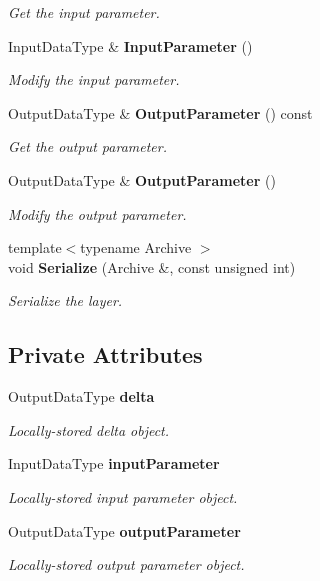 \begin{DoxyCompactItemize}
\begin{DoxyCompactList}\small\item\em Get the input parameter. \end{DoxyCompactList}\item 
Input\+Data\+Type \& {\bf Input\+Parameter} ()
\begin{DoxyCompactList}\small\item\em Modify the input parameter. \end{DoxyCompactList}\item 
Output\+Data\+Type \& {\bf Output\+Parameter} () const 
\begin{DoxyCompactList}\small\item\em Get the output parameter. \end{DoxyCompactList}\item 
Output\+Data\+Type \& {\bf Output\+Parameter} ()
\begin{DoxyCompactList}\small\item\em Modify the output parameter. \end{DoxyCompactList}\item 
{\footnotesize template$<$typename Archive $>$ }\\void {\bf Serialize} (Archive \&, const unsigned int)
\begin{DoxyCompactList}\small\item\em Serialize the layer. \end{DoxyCompactList}\end{DoxyCompactItemize}
\subsection*{Private Attributes}
\begin{DoxyCompactItemize}
\item 
Output\+Data\+Type {\bf delta}
\begin{DoxyCompactList}\small\item\em Locally-\/stored delta object. \end{DoxyCompactList}\item 
Input\+Data\+Type {\bf input\+Parameter}
\begin{DoxyCompactList}\small\item\em Locally-\/stored input parameter object. \end{DoxyCompactList}\item 
Output\+Data\+Type {\bf output\+Parameter}
\begin{DoxyCompactList}\small\item\em Locally-\/stored output parameter object. \end{DoxyCompactList}\end{DoxyCompactItemize}


